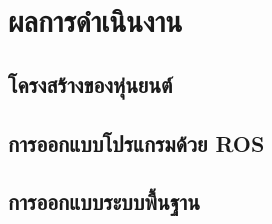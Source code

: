 \chapter{ผลการดำเนินงาน}


\section{โครงสร้างของหุ่นยนต์}


\section{การออกแบบโปรแกรมด้วย ROS}


\section{การออกแบบระบบพื้นฐาน}
